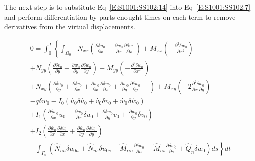 \documentclass[11pt,letterpaper,titlepage,draft]{article}
\newcommand{\PDer}[2]{\frac{\partial #1}{\partial #2}}
\newcommand{\PPDer}[2]{\frac{\partial^2 #1}{\partial #2^2}}
\newcommand{\PPDerMix}[3]{\frac{\partial^2 #1}{\partial #2\; \partial #3}}
\newcommand{\Vartn}[1]{\delta #1}
\numberwithin{equation}{subsection}
\begin{document}
The next step is to substitute Eq~\ref{E:S1001:SS102:14} into Eq~\ref{E:S1001:SS102:7} and perform
differentiation by parts enought times on each term to remove derivatives from the virtual displacements.

\begin{multline}\label{E:S1001:SS102:15}
        0 =  \int_0^T\left\{\int_{\Omega_0} \left[ 
                                               N_{xx} \left(\PDer{\Vartn{u_0}}{x} + \PDer{w_0}{x} \PDer{\Vartn{w_0}}{x} \right)
                                             + M_{xx} \left( -\PPDer{\Vartn{w_0}}{x} \right) \right.\right.\\
                                             + N_{yy} \left(\PDer{\Vartn{v_0}}{y} + \PDer{w_0}{y} \PDer{\Vartn{w_0}}{y} \right)
                                             + M_{yy} \left( -\PPDer{\Vartn{w_0}}{x} \right)\\
                                             + N_{xy} \left(\PDer{\Vartn{u_0}}{y} + \PDer{\Vartn{v_0}}{x} + \PDer{w_0}{x} \PDer{\Vartn{w_0}}{x} +  \PDer{w_0}{y} \PDer{\Vartn{w_0}}{y} +  \right)
                                             + M_{xy} \left( -2\PPDerMix{\Vartn{w_0}}{x}{y} \right) \\
                                             - q\Vartn{w_0} - I_0\left(\dot{u_0}\Vartn{\dot{u_0}} + \dot{v_0}\Vartn{v_0} + \dot{w_0}\Vartn{\dot{w_0}}\right) \\
                                             + I_1\left(\PDer{\Vartn{\dot{w_0}}}{x}\dot{u_0} + \PDer{\dot{w_0}}{x}\Vartn{\dot{u_0}} +   \PDer{\Vartn{\dot{w_0}}}{y}\dot{v_0} +  \PDer{\dot{w_0}}{y}\Vartn{\dot{v_0}} \right) \\
                                             + I_2\left(\PDer{\dot{w_0}}{x} \PDer{\Vartn{\dot{w_0}}}{x} +\PDer{\dot{w_0}}{y} \PDer{\Vartn{\dot{w_0}}}{y} \right) \\
             - \left. \int_{\Gamma_{\sigma}} \left( \hat{N}_{nn}\Vartn{u_{0n}} + \hat{N}_{ns}\Vartn{u_{0s}} - \hat{M}_{nn}\PDer{\Vartn{w_0}}{n} - \hat{M}_{ns}\PDer{\Vartn{w_0}}{s} + \hat{Q}_n \Vartn{w_0} \right) ds \right\} dt
\end{multline}
\end{document}
